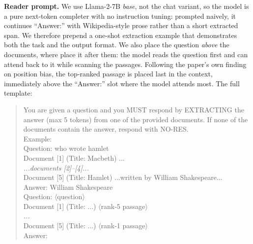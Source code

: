 \documentclass{article}
\begin{document}
\textbf{Reader prompt.} We use Llama-2-7B \emph{base}, not the chat variant, so the model is a pure next-token completer with no instruction tuning: prompted naively, it continues ``Answer:'' with Wikipedia-style prose rather than a short extracted span. We therefore prepend a one-shot extraction example that demonstrates both the task and the output format. We also place the question \emph{above} the documents, where \citet{Cuconasu_2024} place it after them: the model reads the question first and can attend back to it while scanning the passages. Following the paper's own finding on position bias, the top-ranked passage is placed last in the context, immediately above the ``Answer:'' slot where the model attends most. The full template:
\begin{quote}\footnotesize\ttfamily
You are given a question and you MUST respond by EXTRACTING the answer (max 5 tokens) from one of the provided documents. If none of the documents contain the answer, respond with NO-RES.\\[3pt]
Example:\\
Question: who wrote hamlet\\
Document [1] (Title: Macbeth) ...\\
\textrm{\emph{...documents [2]--[4]...}}\\
Document [5] (Title: Hamlet) ...written by William Shakespeare...\\
Answer: William Shakespeare\\[3pt]
Question: \textrm{$\langle$question$\rangle$}\\
Document [1] (Title: ...) \textrm{$\langle$rank-5 passage$\rangle$}\\
\textrm{\emph{...}}\\
Document [5] (Title: ...) \textrm{$\langle$rank-1 passage$\rangle$}\\
Answer:
\end{quote}
\end{document}
